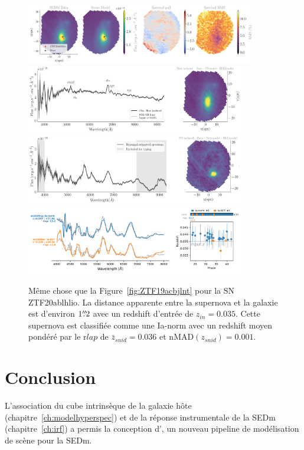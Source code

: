 \documentclass[../main/main.tex]{subfiles}
\begin{document}
\begin{figure}[ht]
  \centering
  \includegraphics[width=0.9\textwidth]{../figures/07_scene/scene_rmspull_ZTF20ablhlio.png}
  \includegraphics[width=0.85\textwidth]{../figures/07_scene/output_host_ZTF20ablhlio.png}
  \includegraphics[width=0.85\textwidth]{../figures/07_scene/output_target_ZTF20ablhlio.png}
  \includegraphics[width=0.85\textwidth]{../figures/07_scene/ZTF20ablhlio_snid_typing.pdf}
  \caption[Extraction de sources pour ZTF20ablhlio.]{Même chose que la
    Figure~\ref{fig:ZTF19acbjlnt} pour la SN ZTF20ablhlio. La distance apparente entre la
supernova et la galaxie est d'environ $1\overset{\prime\prime}{.}2$ avec un redshift
d'entrée de $z_{in}=0.035$. Cette supernova est classifiée comme une Ia-norm
avec un redshift moyen pondéré par le r$lap$ de $\bar{z}_{snid}=0.036$ et
nMAD$(z_{snid})=0.001$.}
  \label{fig:ZTF20ablhlio}
\end{figure}

\section*{Conclusion}
L'association du cube intrinsèque de la galaxie hôte
(chapitre~\ref{ch:modelhyperspec}) et de la réponse instrumentale de la
SEDm (chapitre~\ref{ch:irf}) a permis la conception d'\hypergal, un nouveau
pipeline de modélisation de scène pour la SEDm.
\end{document}
